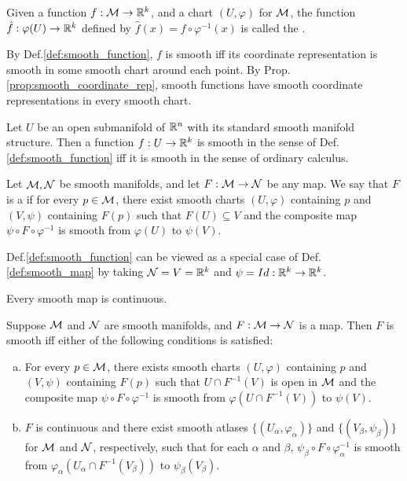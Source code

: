 \documentclass[11pt,a4paper]{article}
\begin{document}
\begin{definition}
Given a function $f:\mathcal{M}\rightarrow \mathbb{R}^k$, and a chart $(U,\varphi)$ for $\mathcal{M}$, the function $\hat{f}:\varphi(U)\rightarrow \mathbb{R}^k$ defined by $\hat{f}(x) = f\circ\varphi^{-1}(x)$ is called the .
\end{definition}

\begin{remark}
By Def.\ref{def:smooth_function}, $f$ is smooth iff its coordinate representation is smooth in some smooth chart around each point. By Prop.\ref{prop:smooth_coordinate_rep}, smooth functions have smooth coordinate representations in every smooth chart.
\end{remark}

\begin{proposition}
Let $U$ be an open submanifold of $\mathbb{R}^n$ with its standard smooth manifold structure. Then a function $f:U\rightarrow \mathbb{R}^k$ is smooth in the sense of Def.\ref{def:smooth_function} iff it is smooth in the sense of ordinary calculus.
\end{proposition}

\begin{definition}\label{def:smooth_map}
Let $\mathcal{M}, \mathcal{N}$ be smooth manifolds, and let $F:\mathcal{M}\rightarrow \mathcal{N}$ be any map. We say that $F$ is a  if for every $p\in\mathcal{M}$, there exist smooth charts $(U,\varphi)$ containing $p$ and $(V,\psi)$ containing $F(p)$ such that $F(U)\subseteq V$ and the composite map $\psi\circ F\circ \varphi^{-1}$ is smooth from $\varphi(U)$ to $\psi(V)$.
\end{definition}

\begin{remark}
Def.\ref{def:smooth_function} can be viewed as a special case of Def.\ref{def:smooth_map} by taking $\mathcal{N}=V=\mathbb{R}^k$ and $\psi=Id:\mathbb{R}^k\rightarrow \mathbb{R}^k$.
\end{remark}

\begin{proposition}
Every smooth map is continuous.
\end{proposition}

\begin{proposition}
Suppose $\mathcal{M}$ and $\mathcal{N}$ are smooth manifolds, and $F:\mathcal{M}\rightarrow \mathcal{N}$ is a map. Then $F$ is smooth iff either of the following conditions is satisfied:
\begin{enumerate}[(a)]
    \item For every $p\in\mathcal{M}$, there exists smooth charts $(U,\varphi)$ containing $p$ and $(V,\psi)$ containing $F(p)$ such that $U\cap F^{-1}(V)$ is open in $\mathcal{M}$ and the composite map $\psi\circ F\circ \varphi^{-1}$ is smooth from $\varphi(U\cap F^{-1}(V))$ to $\psi(V)$.
    \item $F$ is continuous and there exist smooth atlases $\{(U_\alpha,\varphi_\alpha)\}$ and $\{(V_\beta,\psi_\beta)\}$ for $\mathcal{M}$ and $\mathcal{N}$, respectively, such that for each $\alpha$ and $\beta$, $\psi_\beta\circ F\circ \varphi_\alpha^{-1}$ is smooth from $\varphi_\alpha(U_\alpha\cap F^{-1}(V_\beta))$ to $\psi_\beta(V_\beta)$.
\end{enumerate}
\end{proposition}
\end{document}
